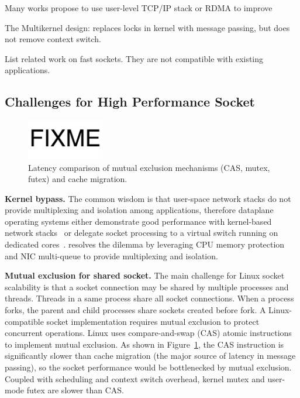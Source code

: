 Many works propose to use user-level TCP/IP stack  or RDMA  to improve




The Multikernel design: replaces locks in kernel with message passing, but does not remove context switch.

List related work on fast sockets. They are not compatible with existing applications.

\subsection{Challenges for High Performance Socket}
\label{subsec:challenges}

\begin{figure}[t]
	\centering
	\includegraphics[width=0.3\textwidth]{images/fixme}
	\caption{Latency comparison of mutual exclusion mechanisms (CAS, mutex, futex) and cache migration.}
	\label{fig:mutual-exclusion}
\end{figure}

\textbf{Kernel bypass.}
The common wisdom is that user-space network stacks do not provide multiplexing and isolation among applications, therefore dataplane operating systems either demonstrate good performance with kernel-based network stacks~\cite{belay2014ix,tsai2017lite} or delegate socket processing to a virtual switch running on dedicated cores~\cite{martins2014clickos,roghanchi2017ffwd}. \sys resolves the dilemma by leveraging CPU memory protection and NIC multi-queue to provide multiplexing and isolation.


\textbf{Mutual exclusion for shared socket.}
The main challenge for Linux socket scalability is that a socket connection may be shared by multiple processes and threads. Threads in a same process share all socket connections. When a process forks, the parent and child processes share sockets created before fork. A Linux-compatible socket implementation requires mutual exclusion to protect concurrent operations. Linux uses compare-and-swap (CAS) atomic instructions to implement mutual exclusion. As shown in Figure~\ref{fig:mutual-exclusion}, the CAS instruction is significantly slower than cache migration (the major source of latency in message passing), so the socket performance would be bottlenecked by mutual exclusion. Coupled with scheduling and context switch overhead, kernel mutex and user-mode futex are slower than CAS.

